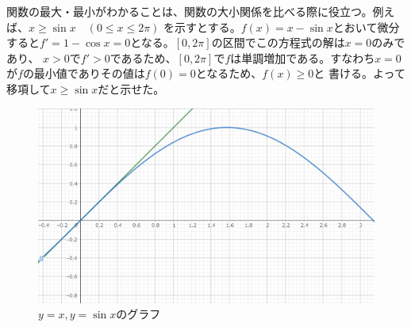 \documentclass[a4j,dvipdfmx]{jsarticle}
\begin{document}
                    関数の最大・最小がわかることは、関数の大小関係を比べる際に役立つ。例えば、$x\geq \sin x\quad(0\leq x \leq 2\pi)$
                    を示すとする。$f(x)=x-\sin x$とおいて微分すると$f'=1 - \cos x = 0$となる。$[0,2\pi]$の区間でこの方程式の解は$x=0$のみであり、
                    $x>0$で$f'>0$であるため、$[0,2\pi]$で$f$は単調増加である。すなわち$x=0$が$f$の最小値でありその値は$f(0)=0$となるため、$f(x)\geq 0$と
                    書ける。よって移項して$x\geq \sin x$だと示せた。
                    \begin{figure}[h]
                        \centering
                        \includegraphics[scale=0.5]{img/QuuNote/x-sinxGraph.png}
                        \caption{$y=x,y=\sin x$のグラフ}
                    \end{figure}
                \clearpage
\end{document}
